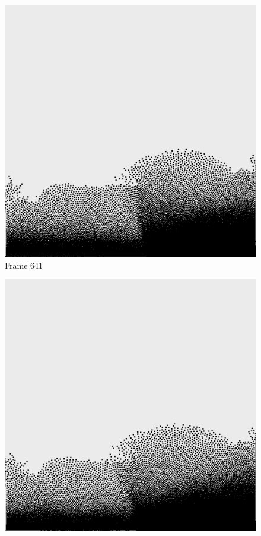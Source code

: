 \documentclass[a4paper, 12pt, oneside]{book}
\begin{document}
\begin{figure}[!ht]
    \addvspace{0.5ex}
        \begin{center}
            \includegraphics[width=\linewidth]{images/test_case_2/641.png}
            Frame 641
        \end{center}
    \endminipage
    \hfill
        \begin{center}
            \includegraphics[width=\linewidth]{images/test_case_2/661.png}

\end{center}
\end{figure}
\end{document}

